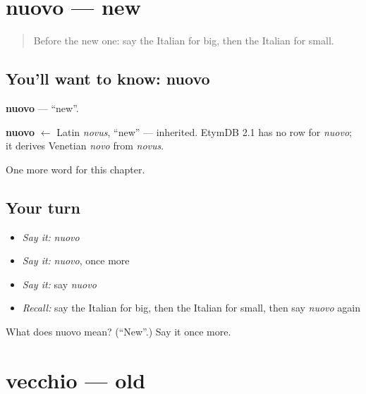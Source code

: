 \section[nuovo]{nuovo — new}

\label{lesson:IT-C72-nuovo}



\begin{quote}
Before the new one: say the Italian for big, then the Italian for small.
\end{quote}

\subsection*{You'll want to know: nuovo}
\textbf{nuovo} — \textquotedblleft{}new\textquotedblright{}.

\begin{cousinweb}
\textbf{nuovo} $\leftarrow$ Latin \emph{novus}, \textquotedblleft{}new\textquotedblright{} — inherited. EtymDB 2.1 has no row for \emph{nuovo}; it derives Venetian \emph{novo} from \emph{novus}.
\end{cousinweb}

\begin{grammarlens}[title={What you've built}]
One more word for this chapter.
\end{grammarlens}

\subsection*{Your turn}
\begin{itemize}
\raggedright
  \item \emph{Say it:} \emph{nuovo}
  \item \emph{Say it:} \emph{nuovo}, once more
  \item \emph{Say it:} say \emph{nuovo}
  \item \emph{Recall:} say the Italian for big, then the Italian for small, then say \emph{nuovo} again
\end{itemize}

\begin{tcolorbox}[breakable,colback=teal!4,colframe=teal!35!black,title={Before you move on}]
What does nuovo mean? (\textquotedblleft{}New\textquotedblright{}.) Say it once more.
\end{tcolorbox}
\section[vecchio]{vecchio — old}

